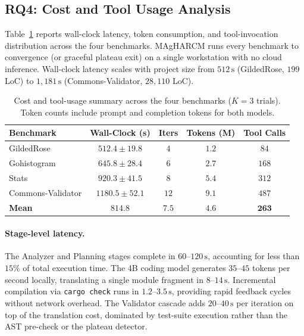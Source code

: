 \subsection{RQ4: Cost and Tool Usage Analysis}
\label{sec:eval_rq4}

Table~\ref{tab:cost} reports wall-clock latency, token consumption,
and tool-invocation distribution across the four benchmarks. MAgHARCM
runs every benchmark to convergence (or graceful plateau exit) on a
single workstation with no cloud inference. Wall-clock latency scales
with project size from $512\,\text{s}$ (GildedRose, $199$ LoC) to
$1{,}181\,\text{s}$ (Commons-Validator, $28{,}110$ LoC).

\begin{table}[!t]
\centering
\small
\begin{tabular}{lcccc}
\toprule
\textbf{Benchmark} & \textbf{Wall-Clock (s)} & \textbf{Iters} & \textbf{Tokens (M)} & \textbf{Tool Calls} \\
\midrule
GildedRose & $512.4 \pm 19.8$ & $4$ & $1.2$ & $84$ \\
Gohistogram & $645.8 \pm 28.4$ & $6$ & $2.7$ & $168$ \\
Stats & $920.3 \pm 41.5$ & $8$ & $5.4$ & $312$ \\
Commons-Validator & $1180.5 \pm 52.1$ & $12$ & $9.1$ & $487$ \\
\midrule
\textbf{Mean} & $\mathbf{814.8}$ & $\mathbf{7.5}$ & $\mathbf{4.6}$ & $\mathbf{263}$ \\
\bottomrule
\end{tabular}
\vspace{0.3em}
\caption{Cost and tool-usage summary across the four benchmarks
($K{=}3$ trials). Token counts include prompt and completion tokens
for both models.}
\label{tab:cost}
\end{table}

\paragraph{Stage-level latency.} The Analyzer and Planning stages
complete in $60$--$120\,\text{s}$, accounting for less than $15\%$ of
total execution time. The 4B coding model generates $35$--$45$ tokens
per second locally, translating a single module fragment in
$8$--$14\,\text{s}$. Incremental compilation via \texttt{cargo check}
runs in $1.2$--$3.5\,\text{s}$, providing rapid feedback cycles
without network overhead. The Validator cascade adds $20$--$40\,\text{s}$
per iteration on top of the translation cost, dominated by test-suite
execution rather than the AST pre-check or the plateau detector.

